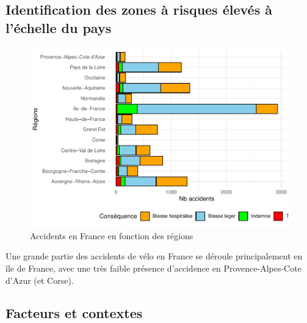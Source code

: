 \documentclass[french,]{compterendu}
\theoremstyle{urcastyle}
\theoremstyle{remark}
\begin{document}
\hypertarget{identification-des-zones-uxe0-risques-uxe9levuxe9s-uxe0-luxe9chelle-du-pays}{%
\subsection{Identification des zones à risques élevés à l'échelle du pays}\label{identification-des-zones-uxe0-risques-uxe9levuxe9s-uxe0-luxe9chelle-du-pays}}

\begin{figure}[H]

{\centering \includegraphics[width=1\linewidth]{Rapport_ADD_LEO-GABET_files/figure-latex/accfranceregion-1} 

}

\caption{Accidents en France en fonction des régions}\label{fig:accfranceregion}
\end{figure}

Une grande partie des accidents de vélo en France se déroule principalement en île de France, avec une très faible présence d'accidence en Provence-Alpes-Cote d'Azur (et Corse).

\hypertarget{facteurs-et-contextes}{%
\subsection{Facteurs et contextes}\label{facteurs-et-contextes}}
\end{document}

